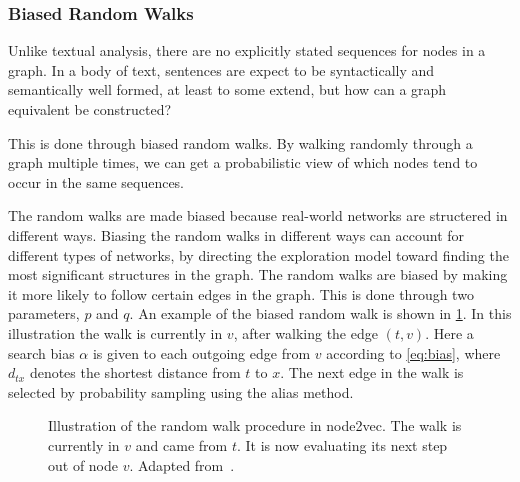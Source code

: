 
\subsubsection{Biased Random Walks}
Unlike textual analysis, there are no explicitly stated sequences for nodes in a graph. In a body of text, sentences are expect to be syntactically and semantically well formed, at least to some extend, but how can a graph equivalent be constructed?

This is done through biased random walks. By walking randomly through a graph multiple times, we can get a probabilistic view of which nodes tend to occur in the same sequences.

The random walks are made biased because real-world networks are structered in different ways. Biasing the random walks in different ways can account for different types of networks, by directing the exploration model toward finding the most significant structures in the graph. The random walks are biased by making it more likely to follow certain edges in the graph. This is done through two parameters, $p$ and $q$. An example of the biased random walk is shown in \cref{fig:randomwalk}. In this illustration the walk is currently in $v$, after walking the edge $(t,v)$. Here a search bias $\alpha$ is given to each outgoing edge from $v$ according to \cref{eq:bias}, where $d_{tx}$ denotes the shortest distance from $t$ to $x$. The next edge in the walk is selected by probability sampling using the alias method.

\begin{figure}%
  \centering
  
\caption[Illustration of random walk in node2vec]{Illustration of the random walk procedure in node2vec. The walk is currently in $v$ and came from $t$. It is now evaluating its next step out of node $v$. Adapted from~\cite{node2vec}.}%
\label{fig:randomwalk}%
\end{figure}

